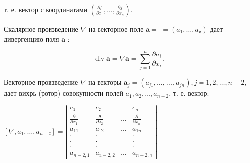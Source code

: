 \documentclass[10pt]{article}
\begin{document}
т. е. вектор с координатами $\left(\frac{\partial f}{\partial x_{1}}, \ldots, \frac{\partial f}{\partial x_{n}}\right)$.



Скалярное произведение $\nabla$ на векторное поле $\boldsymbol{a}=$ $=\left(a_{1}, \ldots, a_{n}\right)$ дает дивергенцию поля $\boldsymbol{a}$ :



\[

\operatorname{div} \boldsymbol{a}=\nabla \boldsymbol{a}=\sum_{j=1}^{n} \frac{\partial a_{i}}{\partial x_{i}} .

\]



Векторное произведение $\nabla$ на векторы $\boldsymbol{a}_{j}=\left(a_{j 1}, \ldots\right.$, $\left.\ldots, a_{j n}\right), j=1,2, \ldots, n-2$, дает вихрь (ротор) совокупности полей $a_{1}, a_{2}, \ldots, a_{n-2}$, т. е. вектор:



$\left[\nabla, a_{1}, \ldots, a_{n-2}\right]=\left|\begin{array}{cccc}e_{1} & e_{2} & \ldots & e_{n} \\ \frac{\partial}{\partial x_{1}} & \frac{\partial}{\partial x_{2}} & \ldots & \frac{\partial}{\partial x_{n}} \\ a_{11} & a_{12} & \ldots & a_{1 n} \\ \cdot & \cdot & & \cdot \\ \cdot & \cdot & & \cdot \\ \cdot & \cdot & & \cdot \\ a_{n-2,1} & a_{n-2,2} & \ldots & a_{n-2, n}\end{array}\right|$
\end{document}
